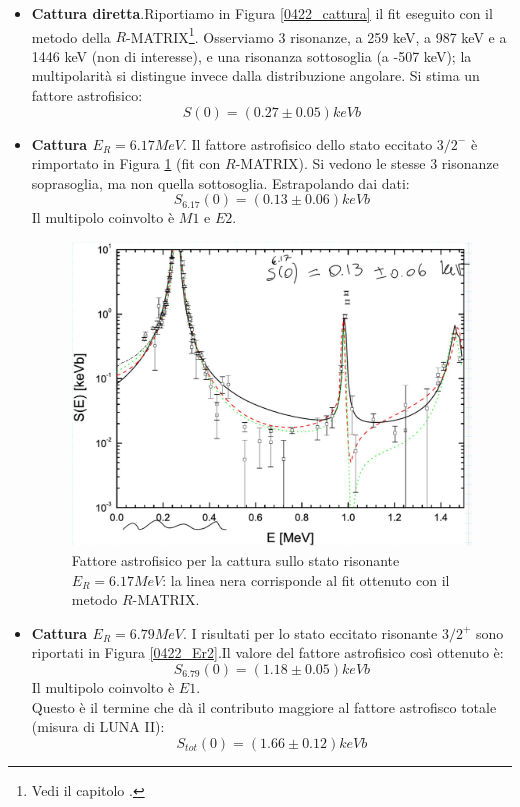\begin{itemize}
	\item \textbf{Cattura diretta}.Riportiamo in Figura \ref{0422_cattura} il fit eseguito con il metodo della $R$-MATRIX\footnote{Vedi il capitolo .}. Osserviamo 3 risonanze, a 259 keV, a 987 keV e a 1446 keV (non di interesse), e una risonanza sottosoglia (a -507 keV); la multipolarità si distingue invece dalla distribuzione angolare. Si stima un fattore astrofisico: $$S(0)= (0.27\pm0.05) \unit{keV b}$$
	\item \textbf{Cattura $E_R=6.17\unit{MeV}$}. Il fattore astrofisico dello stato eccitato $3/2^-$ è rimportato in Figura \ref{0422_Er1} (fit con $R$-MATRIX). Si vedono le stesse 3 risonanze soprasoglia, ma non quella sottosoglia. Estrapolando dai dati: $$S_{6.17}(0)= (0.13\pm0.06) \unit{keV b}$$ Il multipolo coinvolto è $M1$ e $E2$. %
	\begin{figure}[h]
		\centering
		\includegraphics[scale=0.5]{Immagini/0422_0-Se-1.png}
		\caption{Fattore astrofisico per la cattura sullo stato risonante $E_R=6.17\unit{MeV}$: la linea nera corrisponde al fit ottenuto con il metodo $R$-MATRIX.}
		\label{0422_Er1}
	\end{figure}	
	\item \textbf{Cattura $E_R=6.79\unit{MeV}$}. I risultati per lo stato eccitato risonante $3/2^+$ sono riportati in Figura \ref{0422_Er2}.Il valore del fattore astrofisico così ottenuto è: $$S_{6.79}(0) = (1.18\pm 0.05)\unit{keV b}$$ Il multipolo coinvolto è $E1$.\\ Questo è il termine che dà il contributo maggiore al fattore astrofisco totale (misura di LUNA II): $$S_{tot}(0) = (1.66\pm 0.12)\unit{keV b}$$%

\end{itemize}
